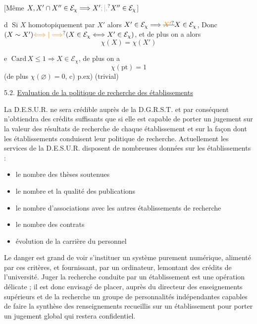  [Même $X,X'\cap X''\in\mathcal E_{\chi}\Longrightarrow X'\unsure{;|,}X''\in\mathcal E_{\chi}$]

\textcircled{d} Si $X$  homotopiquement par $X'$
alors $X'\in\mathcal E_{\chi}\Longrightarrow\deleted{\unsure{X'}}X\in\mathcal E_{\chi}$, Donc
$(X\sim X')\unsure{\Longleftrightarrow|\Longrightarrow}(X\in\mathcal E_{\chi}\Longleftrightarrow X'\in\mathcal E_{\chi})$, et de plus
on a alors
\[
\chi(X)=\chi(X')
\]

\textcircled{e}  $\mathrm{Card}\,X\leq1\Longrightarrow X\in\mathcal E_{\chi}$, de
plus on a
\[
\chi(\mathrm{pt})=1
\]
(de plus $\chi(\varnothing)=0$,  c) p.ex) \qquad (trivial)

5.2. \uline{Evaluation de la politique de recherche des établissements}

La D.E.S.U.R. ne sera crédible auprès de la D.G.R.S.T.
et par conséquent n'obtiendra des crédits suffisants que si elle est capable de
porter un jugement sur la valeur des résultats de recherche de chaque établissement
et sur la façon dont les établissements conduisent leur politique de recherche.
Actuellement les services de la D.E.S.U.R. disposent de nombreuses données sur les
établissements :

\begin{itemize}[label={-}]
\item le nombre des thèses soutenues
\item le nombre et la qualité des publications
\item le nombre d'associations avec les autres établissements de recherche
\item le nombre des contrats
\item évolution de la carrière du personnel
\end{itemize}

Le danger est grand de voir s'instituer un système purement
numérique, alimenté par ces critères, et fournissant, par un ordinateur, le\unsure{:|;}montant
des crédits de l'université. Juger la recherche conduite par un établissement est
une opération délicate ; il est donc envisagé de placer, auprès du directeur des
enseignements supérieurs et de la recherche un groupe de personnalités indépendantes
capables de faire la synthèse des renseignements recueillis sur un établissement
pour porter un jugement global qui restera confidentiel.

